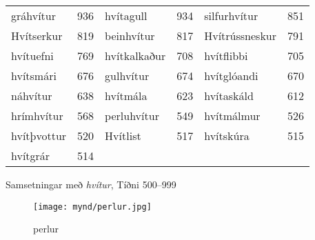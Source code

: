 \documentclass{../litmal.tex}{subfiles}
\begin{document}
\begin{wordlist}[H]
\begin{tcolorbox}

	\setlength{\extrarowheight}{3pt}
	\begin{tabular}{BlBlBl}
		gráhvítur	& 936		& 
		hvítagull		& 934		& 
		silfurhvítur	& 851		\\ 
		Hvítserkur	& 819		& 
		beinhvítur	& 817		& 
		Hvítrússneskur & 791		\\ 
		hvítuefni		& 769		& 
		hvítkalkaður	& 708		& 
		hvítflibbi		& 705		\\ 	
		hvítsmári	& 676		& 
		gulhvítur		& 674		& 
		hvítglóandi	& 670		\\ 	
		náhvítur		& 638		& 
		hvítmála		& 623		& 
		hvítaskáld	& 612		\\ 
		hrímhvítur	& 568		& 
		perluhvítur	& 549		& 	
		hvítmálmur	& 526		\\ 	
		hvítþvottur	& 520		& 
		Hvítlist		& 517		& 
		hvítskúra	& 515		\\ 
		hvítgrár		& 514		& 	
					&			&
					&
	\end{tabular}

\end{tcolorbox}
	\caption{Samsetningar með \textit{hvítur}, Tíðni 500--999}
	\label{listi:hvitt.500}
\end{wordlist}	

\begin{figure}[H]
\begin{tcolorbox}
\centering
	\texttt{[image: mynd/perlur.jpg]}
\end{tcolorbox}
	\caption{perlur}
	\label{mynd:perlur}
\end{figure}
\end{document}
